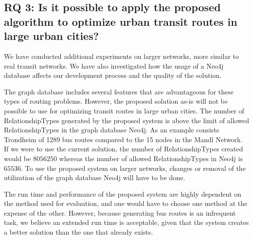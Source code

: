 \subsection*{RQ 3: Is it possible to apply the proposed algorithm to optimize urban transit routes in large urban cities?}

We have conducted additional experiments on larger networks, more similar to real transit networks. We have also investigated how the usage of a Neo4j database affects our development process and the quality of the solution. 

The graph database includes several features that are advantageous for these types of routing problems. However, the proposed solution as-is will not be possible to use for optimizing transit routes in large urban cities. The number of RelationshipTypes generated by the proposed system is above the limit of allowed RelationshipTypes in the graph database Neo4j. As an example consists Trondheim of 1289 bus routes compared to the 15 nodes in the Mandl Network. If we were to use the current solution, the number of RelationshipTypes created would be $8056250$ whereas the number of allowed RelationshipTypes in Neo4j is $65536$. To use the proposed system on larger networks, changes or removal of the utilization of the graph database Neo4j will have to be done. 

The run time and performance of the proposed system are highly dependent on the method used for evaluation, and one would have to choose one method at the expense of the other. However, because generating bus routes is an infrequent task, we believe an extended run time is acceptable, given that the system creates a better solution than the one that already exists.  
